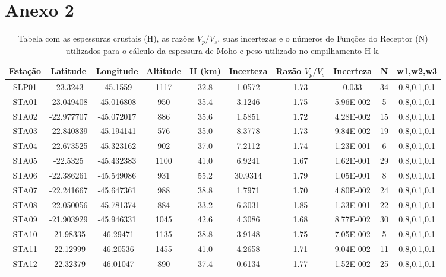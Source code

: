 \chapter*{Anexo 2}
\begin{table}[!ht]
\label{tabelaMoho}
\begin{center}
\small
\caption{Tabela com as espessuras crustais (H), as razões $V_{p}/V_{s}$, suas incertezas e o números de Funções do Receptor (N) utilizados para o cálculo da espessura de Moho e peso utilizado no empilhamento H-k.}
\begin{tabular}{| c | c | c | c | c | c | c | c | c | c |}
\hline
{\textbf{Estação}} & {\textbf{Latitude}} & {\textbf{Longitude}} & {\textbf{Altitude}} & {\textbf{H (km)}} & {\textbf{Incerteza}} & {\textbf{Razão $V_{p}/V_{s}$}} & {\textbf{Incerteza}} & {\textbf{N}} & {\textbf{w1,w2,w3}}\\
\hline 
SLP01 & -23.3243 & -45.1559 & 1117 & 32.8 & 1.0572 & 1.73 & 0.033 & 34 & 0.8,0.1,0.1\\
STA01 & -23.049408 & -45.016808 & 950 & 35.4 & 3.1246 & 1.75 & 5.96E-002 & 5 & 0.8,0.1,0.1\\
STA02 & -22.977707 & -45.072017 & 886 & 35.6 & 1.5851 & 1.72 & 4.28E-002 & 15 & 0.8,0.1,0.1\\
STA03 & -22.840839 & -45.194141 & 576 & 35.0 & 8.3778 & 1.73 & 9.84E-002 & 19 & 0.8,0.1,0.1\\
STA04 & -22.673525 & -45.323162 & 902 & 37.0 & 7.2112 & 1.74 & 1.23E-001 & 6 & 0.8,0.1,0.1\\
STA05 & -22.5325 & -45.432383 & 1100 & 41.0 & 6.9241 & 1.67 & 1.62E-001 & 29 & 0.8,0.1,0.1\\
STA06 & -22.386261 & -45.549086 & 931 & 55.2 & 30.9314 & 1.79 & 1.05E-001 & 8 & 0.8,0.1,0.1\\
STA07 & -22.241667 & -45.647361 & 988 & 38.8 & 1.7971 & 1.70 & 4.80E-002 & 24 & 0.8,0.1,0.1\\
STA08 & -22.050056 & -45.781374 & 884 & 33.2 & 6.3031 & 1.85 & 1.33E-001 & 22 & 0.8,0.1,0.1\\
STA09 & -21.903929 & -45.946331 & 1045 & 42.6 & 4.3086 & 1.68 & 8.77E-002 & 30 & 0.8,0.1,0.1\\
STA10 & -21.98335 & -46.29471 & 1135 & 38.8 & 3.9148 & 1.75 & 7.05E-002 & 5 & 0.8,0.1,0.1\\
STA11 & -22.12999 & -46.20536 & 1455 & 41.0 & 4.2658 & 1.71 & 9.04E-002 & 11 & 0.8,0.1,0.1\\
STA12 & -22.32379 & -46.01047 & 890 & 37.4 & 0.6134 & 1.77 & 1.52E-002 & 25 & 0.8,0.1,0.1\\

\end{tabular}
\end{center}
\end{table}
